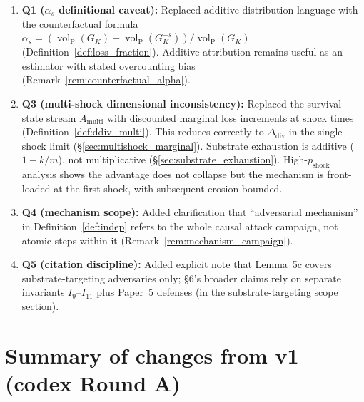 \documentclass{article}
\DeclareMathOperator{\vol}{vol}
\newcommand{\volL}{{\vol_{\mathrm{P}}}}
\newcommand{\Ddiv}{\Delta_{\mathrm{div}}}
\newcommand{\pshock}{p_{\mathrm{shock}}}
\begin{document}
\begin{enumerate}
\item \textbf{Q1 ($\alpha_s$ definitional caveat):} Replaced
  additive-distribution language with the counterfactual formula
  $\alpha_s = (\volL(G_K) - \volL(G_K^{-s})) / \volL(G_K)$
  (Definition~\ref{def:loss_fraction}).  Additive attribution
  remains useful as an estimator with stated overcounting bias
  (Remark~\ref{rem:counterfactual_alpha}).

\item \textbf{Q3 (multi-shock dimensional inconsistency):} Replaced
  the survival-state stream $A_{\mathrm{multi}}$ with discounted
  marginal loss increments at shock times
  (Definition~\ref{def:ddiv_multi}).  This reduces correctly to
  $\Ddiv$ in the single-shock limit
  (\S\ref{sec:multishock_marginal}).  Substrate exhaustion is
  additive ($1 - k/m$), not multiplicative
  (\S\ref{sec:substrate_exhaustion}).  High-$\pshock$ analysis
  shows the advantage does not collapse but the mechanism is
  front-loaded at the first shock, with subsequent erosion bounded.

\item \textbf{Q4 (mechanism scope):} Added clarification that
  ``adversarial mechanism'' in Definition~\ref{def:indep} refers to
  the whole causal attack campaign, not atomic steps within it
  (Remark~\ref{rem:mechanism_campaign}).

\item \textbf{Q5 (citation discipline):} Added explicit note that
  Lemma~5c covers substrate-targeting adversaries only; \S6's
  broader claims rely on separate invariants $I_9$--$I_{11}$ plus
  Paper~5 defenses (in the substrate-targeting scope section).
\end{enumerate}

\section{Summary of changes from v1 (codex Round A)}
\end{document}
